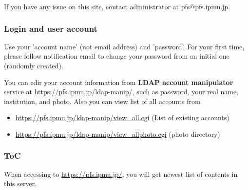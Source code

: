 \documentclass[a4paper,notitlepage]{article}
\begin{document}
If you have any issue on this site, contact administrator 
at \url{pfs@pfs.ipmu.jp}. 

\subsubsection{Login and user account}

Use your 'account name' (not email address) and 'password'.
For your first time, please follow notification email to change your password 
from an initial one (randomly created). 

You can edir your account information from {\bf LDAP account manipulator} 
service at \url{https://pfs.ipmu.jp/ldap-manip/}, 
such as password, your real name, institution, and photo. 
Also you can view list of all accounts from 

\begin{itemize}
  \item \url{https://pfs.ipmu.jp/ldap-manip/view_all.cgi} (List of existing accounts)
  \item \url{https://pfs.ipmu.jp/ldap-manip/view_allphoto.cgi} (photo directory)
\end{itemize}

\subsubsection{ToC}

When accessing to \url{https://pfs.ipmu.jp/}, you will get newest list of 
contents in this server. 
\end{document}
